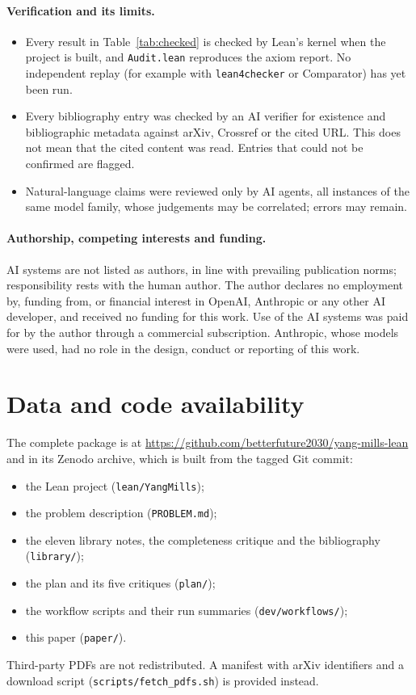 \documentclass[11pt]{article}
\theoremstyle{definition}
\theoremstyle{remark}
\newcommand{\lean}[1]{\texttt{\hyphenchar\font=-1\relax #1}}
\begin{document}
\paragraph{Verification and its limits.}
\begin{itemize}[leftmargin=*]
\item Every result in Table~\ref{tab:checked} is checked by Lean's kernel when the project is
  built, and \lean{Audit.lean} reproduces the axiom report. No independent replay (for example
  with \lean{lean4checker} or Comparator) has yet been run.
\item Every bibliography entry was checked by an AI verifier for existence and bibliographic
  metadata against arXiv, Crossref or the cited URL. This does not mean that the cited content was
  read. Entries that could not be confirmed are flagged.
\item Natural-language claims were reviewed only by AI agents, all instances of the same model
  family, whose judgements may be correlated; errors may remain.
\end{itemize}

\paragraph{Authorship, competing interests and funding.}
AI systems are not listed as authors, in line with prevailing publication norms; responsibility
rests with the human author. The author declares no employment by, funding from, or financial
interest in OpenAI, Anthropic or any other AI developer, and received no funding for this work. Use
of the AI systems was paid for by the author through a commercial subscription. Anthropic, whose
models were used, had no role in the design, conduct or reporting of this work.

\section{Data and code availability}\label{sec:data}
The complete package is at \url{https://github.com/betterfuture2030/yang-mills-lean} and in its
Zenodo archive, which is built from the tagged Git commit:
\begin{itemize}[leftmargin=*]
\item the Lean project (\lean{lean/YangMills});
\item the problem description (\lean{PROBLEM.md});
\item the eleven library notes, the completeness critique and the bibliography
  (\lean{library/});
\item the plan and its five critiques (\lean{plan/});
\item the workflow scripts and their run summaries (\lean{dev/workflows/});
\item this paper (\lean{paper/}).
\end{itemize}
Third-party PDFs are not redistributed. A manifest with arXiv identifiers and a download script
(\lean{scripts/fetch\_pdfs.sh}) is provided instead.
\end{document}
